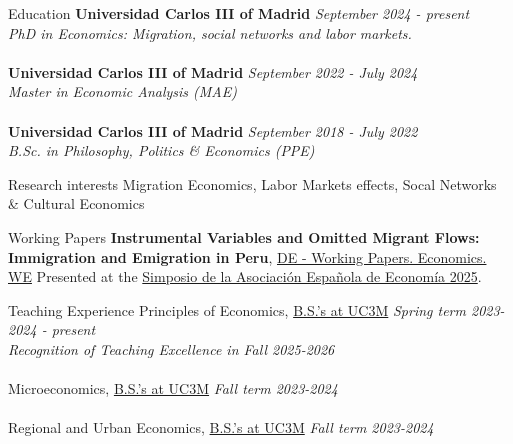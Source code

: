 \documentclass{resume}
\begin{document}
  \begin{rSection}{Education}
    {\bf Universidad Carlos III of Madrid} \hfill {\em September 2024 - present} \\
    {\it PhD in Economics: Migration, social networks and labor markets.} \\ 
        \vspace{0.03cm} \\
    {\bf Universidad Carlos III of Madrid} \hfill {\em September 2022 - July 2024} \\
    {\it Master in Economic Analysis (MAE)} \\ 
        \vspace{0.03cm} \\
    {\bf Universidad Carlos III of Madrid} \hfill {\em September 2018 - July 2022} \\
    {\it B.Sc. in Philosophy, Politics \& Economics (PPE)} \\ 
  \end{rSection}
  \begin{rSection}{Research interests}
    {Migration Economics, Labor Markets effects, Socal Networks \& Cultural Economics}  
  \end{rSection}
  \begin{rSection}{Working Papers}
    {\textbf{Instrumental Variables and Omitted Migrant Flows: Immigration and Emigration in Peru}, 
    \href{https://e-archivo.uc3m.es/entities/publication/660823f9-436f-4b0a-acc9-afe987fdb6e1}{DE - Working Papers. Economics. WE}} Presented at the \href{https://asesec.org/simposio-de-la-asociacion-espanola-de-economia-2025/}{Simposio de la Asociación Española de Economía 2025}.
\end{rSection}  
\begin{rSection}{Teaching Experience}
  {Principles of Economics, \href{https://aplicaciones.uc3m.es/cpa/generaFicha?est=202&plan=398&asig=13635&idioma=2}{B.S.'s at UC3M}} \hfill {\em Spring term 2023-2024 - present} \\
  {\it Recognition of Teaching Excellence in Fall 2025-2026} \\
  \vspace{0.02cm} \\
  {Microeconomics, \href{https://aplicaciones.uc3m.es/cpa/generaFicha?est=202&plan=398&asig=13639&idioma=2}{B.S.'s at UC3M}} \hfill {\em Fall term 2023-2024} \\
  \vspace{0.02cm} \\
  {Regional and Urban Economics, \href{https://aplicaciones.uc3m.es/cpa/generaFicha?est=202&plan=398&asig=13643&idioma=2}{B.S.'s at UC3M}} \hfill {\em Fall term 2023-2024} \\
\end{rSection}  
\end{document}
